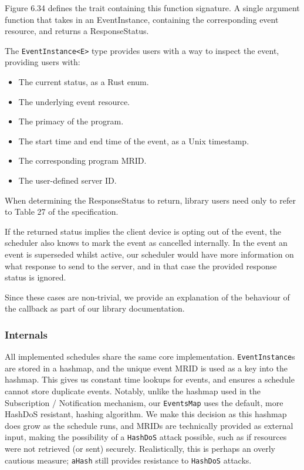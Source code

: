 Figure 6.34 defines the trait containing this function signature. A single argument function that takes in an EventInstance, containing the corresponding event resource, and returns a ResponseStatus. 

The \texttt{EventInstance<E>} type provides users with a way to inspect the event, providing users with:

\begin{itemize}
    \item The current status, as a Rust enum.
    \item The underlying event resource.
    \item The primacy of the program.
    \item The start time and end time of the event, as a Unix timestamp.
    \item The corresponding program MRID.
    \item The user-defined server ID.
\end{itemize}

When determining the ResponseStatus to return, library users need only to refer to Table 27 of the specification.

If the returned status implies the client device is opting out of the event, the scheduler also knows to mark the event as cancelled internally. In the event an event is superseded whilst active, our scheduler would have more information on what response to send to the server, and in that case the provided response status is ignored.

Since these cases are non-trivial, we provide an explanation of the behaviour of the callback as part of our library documentation.

\subsubsection{Internals}
All implemented schedules share the same core implementation. \texttt{EventInstance}s are stored in a hashmap, and the unique event MRID is used as a key into the hashmap. This gives us constant time lookups for events, and ensures a schedule cannot store duplicate events. Notably, unlike the hashmap used in the Subscription / Notification mechanism, our \texttt{EventsMap} uses the default, more HashDoS resistant, hashing algorithm. We make this decision as this hashmap does grow as the schedule runs, and MRIDs are technically provided as external input, making the possibility of a \texttt{HashDoS} attack possible, such as if resources were not retrieved (or sent) securely.
Realistically, this is perhaps an overly cautious measure; \texttt{aHash} still provides resistance to \texttt{HashDoS} attacks.

